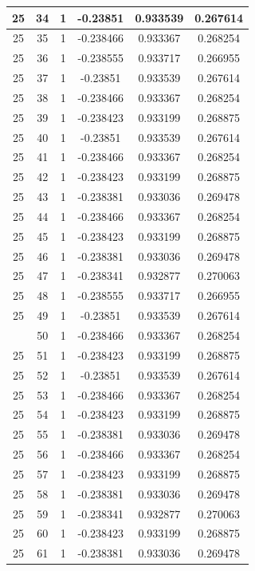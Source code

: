 \documentclass[12pt,a4paper]{article}
\numberwithin{equation}{section}
\numberwithin{figure}{section}
\numberwithin{table}{section}
\begin{document}
\begin{longtable}{|c|c|c|c|c|c|}
25 & 34 & 1 & -0.23851 & 0.933539 & 0.267614 \\ \hline
25 & 35 & 1 & -0.238466 & 0.933367 & 0.268254 \\ \hline
25 & 36 & 1 & -0.238555 & 0.933717 & 0.266955 \\ \hline
25 & 37 & 1 & -0.23851 & 0.933539 & 0.267614 \\ \hline
25 & 38 & 1 & -0.238466 & 0.933367 & 0.268254 \\ \hline
25 & 39 & 1 & -0.238423 & 0.933199 & 0.268875 \\ \hline
25 & 40 & 1 & -0.23851 & 0.933539 & 0.267614 \\ \hline
25 & 41 & 1 & -0.238466 & 0.933367 & 0.268254 \\ \hline
25 & 42 & 1 & -0.238423 & 0.933199 & 0.268875 \\ \hline
25 & 43 & 1 & -0.238381 & 0.933036 & 0.269478 \\ \hline
25 & 44 & 1 & -0.238466 & 0.933367 & 0.268254 \\ \hline
25 & 45 & 1 & -0.238423 & 0.933199 & 0.268875 \\ \hline
25 & 46 & 1 & -0.238381 & 0.933036 & 0.269478 \\ \hline
25 & 47 & 1 & -0.238341 & 0.932877 & 0.270063 \\ \hline
25 & 48 & 1 & -0.238555 & 0.933717 & 0.266955 \\ \hline
25 & 49 & 1 & -0.23851 & 0.933539 & 0.267614 \\ \hline
\pagebreak
25 & 50 & 1 & -0.238466 & 0.933367 & 0.268254 \\ \hline
25 & 51 & 1 & -0.238423 & 0.933199 & 0.268875 \\ \hline
25 & 52 & 1 & -0.23851 & 0.933539 & 0.267614 \\ \hline
25 & 53 & 1 & -0.238466 & 0.933367 & 0.268254 \\ \hline
25 & 54 & 1 & -0.238423 & 0.933199 & 0.268875 \\ \hline
25 & 55 & 1 & -0.238381 & 0.933036 & 0.269478 \\ \hline
25 & 56 & 1 & -0.238466 & 0.933367 & 0.268254 \\ \hline
25 & 57 & 1 & -0.238423 & 0.933199 & 0.268875 \\ \hline
25 & 58 & 1 & -0.238381 & 0.933036 & 0.269478 \\ \hline
25 & 59 & 1 & -0.238341 & 0.932877 & 0.270063 \\ \hline
25 & 60 & 1 & -0.238423 & 0.933199 & 0.268875 \\ \hline
25 & 61 & 1 & -0.238381 & 0.933036 & 0.269478 \\ \hline

\end{longtable}
\end{document}
